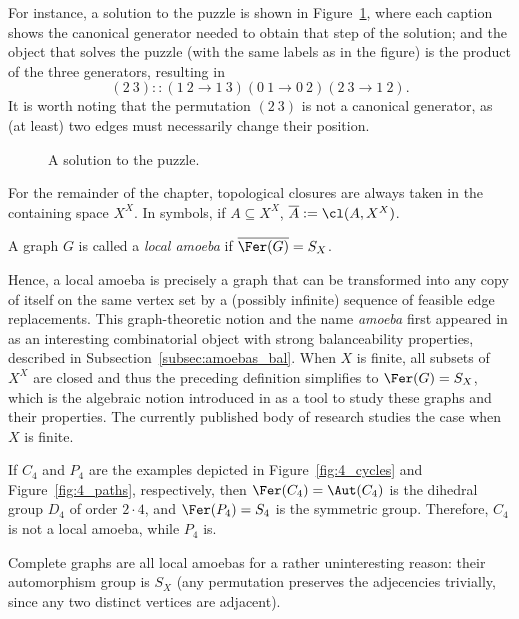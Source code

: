 For instance, a solution to the puzzle is shown in Figure~\ref{fig:4_cycles_solution}, where each caption shows the canonical generator needed to obtain that step of the solution; and the \tfer object that solves the puzzle (with the same labels as in the figure) is the product of the three generators, resulting in
$$(2\ 3)::(1\ 2\to1\ 3)(0\ 1\to0\ 2)(2\ 3\to1\ 2).$$
It is worth noting that the permutation $(2\ 3)$ is not a canonical generator, as (at least) two edges must necessarily change their position.

\begin{figure}[htbp]
    \centering
    
    \caption{A solution to the \tfer puzzle.}
    \label{fig:4_cycles_solution}
\end{figure}

For the remainder of the chapter, topological closures are always taken in the containing space $X^X$.
In symbols, if $A\subseteq X^X$, $\overline A:=\cl(A,X^X)$.

\begin{definition}\label{def:local_amoeba}
    A graph $G$ is called a \emph{local amoeba} if $\overline{\Fer(G)}=S_X$.
\end{definition}

Hence, a local amoeba is precisely a graph that can be transformed into any copy of itself on the same vertex set by a (possibly infinite) sequence of feasible edge replacements.
This graph-theoretic notion and the name \emph{amoeba} first appeared in \cite{unavoidable_chromatic} as an interesting combinatorial object with strong balanceability properties, described in Subsection~\ref{subsec:amoebas_bal}.
When $X$ is finite, all subsets of $X^X$ are closed and thus the preceding definition simplifies to $\Fer(G)=S_X$, which is the algebraic notion introduced in \cite{Caro2020GraphsIU} as a tool to study these graphs and their properties.
The currently published body of research studies the case when $X$ is finite.

If $C_4$ and $P_4$ are the examples depicted in Figure~\ref{fig:4_cycles} and Figure~\ref{fig:4_paths}, respectively, then $\Fer(C_4)=\Aut(C_4)$ is the dihedral group $D_4$ of order $2\cdot4$, and $\Fer(P_4)=S_4$ is the symmetric group.
Therefore, $C_4$ is not a local amoeba, while $P_4$ is.

Complete graphs are all local amoebas for a rather uninteresting reason: their automorphism group is $S_X$ (any permutation preserves the adjecencies trivially, since any two distinct vertices are adjacent).

